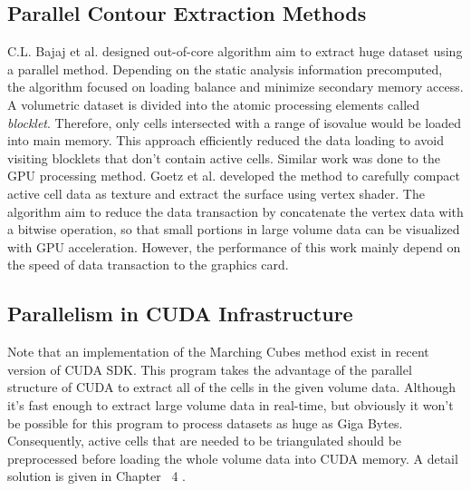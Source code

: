 \documentclass[11pt, b5paper]{report}
\begin{document}






\subsection{Parallel Contour Extraction Methods}
C.L. Bajaj et al.\cite{bajaj1999parallel} designed out-of-core algorithm aim
to extract huge dataset using a parallel method. Depending on the static 
analysis information precomputed, the algorithm focused on loading balance 
and minimize secondary memory access. A volumetric dataset is divided into 
the atomic processing elements called \emph{blocklet}. Therefore, only cells 
intersected with a range of isovalue would be loaded into main memory.
This approach efficiently reduced the data loading to avoid visiting blocklets
that don't contain active cells. Similar work was done to the GPU 
processing method. Goetz et al.\cite{goetz2005real} developed the method to
carefully compact active cell data as texture and extract the surface
using vertex shader. The algorithm aim to reduce the data transaction 
by concatenate the vertex data with a bitwise operation, so that small portions
in large volume data can be visualized with GPU acceleration. However, the
performance of this work mainly depend on the speed of data transaction to
the graphics card. 

\subsection{Parallelism in CUDA Infrastructure}
Note that an implementation of the Marching Cubes method 
\cite{nvidia:_march_cubes_isosur} exist in recent version of CUDA SDK. This 
program takes the advantage of the parallel structure of CUDA to extract all 
of the cells in the given volume data. %
Although it's fast enough to extract 
large volume data in real-time, but obviously it won't be possible for this 
program to process datasets as huge as Giga Bytes. Consequently, active cells 
that are needed to be triangulated should be preprocessed before loading the 
whole volume data into CUDA memory. A detail solution is given in Chapter~
4%
.
\end{document}
